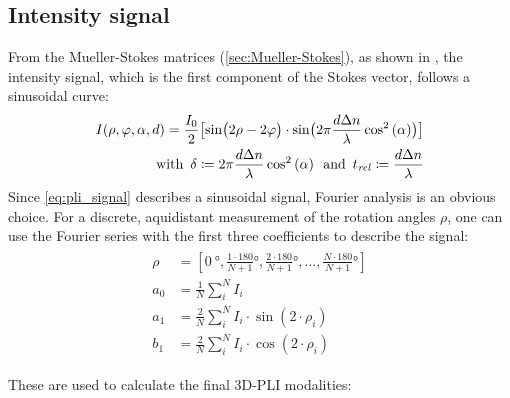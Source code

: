 \subsection{Intensity signal}
% 
From the Mueller-Stokes matrices (\cref{sec:Mueller-Stokes}), as shown in \cite{MenzelMaster,MenzelDissertation}, the intensity signal, which is the first component of the Stokes vector, follows a sinusoidal curve:
% 
\begin{align}
\label{eq:pli_signal}
\begin{split}
I(\rho, \varphi, \alpha, d) =\frac{I_0}{2}\bigl[ \sin\bigl(2\rho - 2\varphi \bigr)\cdot \sin \bigl( 2\pi\frac{d \textnormal{$\Delta n$}}{\lambda} \cos^2\left( \alpha \right) \bigr) \bigr] \\
\text{with} \enspace \delta \coloneqq 2\pi\frac{d \textnormal{$\Delta n$}}{\lambda} \cos^2\left( \alpha \right) \enspace 
\text{and} \enspace \textnormal{$t_\mathit{rel}$} \coloneqq \frac{d \textnormal{$\Delta n$}}{\lambda}
\end{split}
\end{align}
% 
Since \cref{eq:pli_signal} describes a sinusoidal signal, Fourier analysis is an obvious choice.
For a discrete, aquidistant measurement of the rotation angles $\rho$, one can use the Fourier series with the first three coefficients to describe the signal:
% 
\begin{align}
\begin{split}
\rho &= [\SI{0}{\degree}, \frac{1\cdot180}{N+1}\si{\degree}, \frac{2\cdot180}{N+1}\si{\degree}, ..., \frac{N\cdot180}{N+1}\si{\degree}]\\
a_0 &= \frac{1}{N} \sum_i^N I_i\\
a_1 &= \frac{2}{N} \sum_i^N I_i \cdot \sin(2 \cdot \rho_i)\\
b_1 &= \frac{2}{N} \sum_i^N I_i \cdot \cos(2 \cdot \rho_i)
\end{split}
\end{align}

These are used to calculate the final \ac{3D-PLI} modalities:

